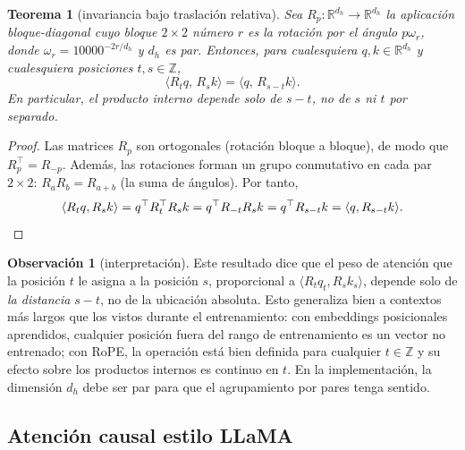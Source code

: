 \documentclass[11pt]{report}
\newenvironment{tcolorbox}[1][]{\par\medskip\noindent\ignorespaces}{\par\medskip}
\theoremstyle{definition}
\newtheorem{observacion}[definicion]{Observación}
\theoremstyle{plain}
\newtheorem{teorema}[definicion]{Teorema}
\numberwithin{equation}{section}
\newcommand{\R}{\mathbb{R}}
\newcommand{\Z}{\mathbb{Z}}
\begin{document}
\begin{tcolorbox}[colback=blue!8, colframe=blue!8, boxrule=0pt]
\begin{teorema}[invariancia bajo traslación relativa]
Sea \(R_p:\R^{d_h}\to\R^{d_h}\) la aplicación bloque-diagonal cuyo bloque \(2\times 2\) número \(r\) es la rotación por el ángulo \(p\omega_r\), donde \(\omega_r=10000^{-2r/d_h}\) y \(d_h\) es par. Entonces, para cualesquiera \(q,k\in\R^{d_h}\) y cualesquiera posiciones \(t,s\in\Z\),
\begin{equation*}
    \langle R_t q,\,R_s k\rangle = \langle q,\,R_{s-t}k\rangle.
\end{equation*}
En particular, el producto interno depende solo de \(s-t\), no de \(s\) ni \(t\) por separado.
\end{teorema}
\end{tcolorbox}

\begin{proof}
Las matrices \(R_p\) son ortogonales (rotación bloque a bloque), de modo que \(R_p^\top=R_{-p}\). Además, las rotaciones forman un grupo conmutativo en cada par \(2\times 2\): \(R_a R_b=R_{a+b}\) (la suma de ángulos). Por tanto,
\begin{equation*}
    \langle R_t q,R_s k\rangle = q^\top R_t^\top R_s k = q^\top R_{-t}R_s k = q^\top R_{s-t}k = \langle q,R_{s-t}k\rangle.\qedhere
\end{equation*}
\end{proof}

\begin{observacion}[interpretación]
Este resultado dice que el peso de atención que la posición \(t\) le asigna a la posición \(s\), proporcional a \(\langle R_t q_t,R_s k_s\rangle\), depende solo de \emph{la distancia} \(s-t\), no de la ubicación absoluta. Esto generaliza bien a contextos más largos que los vistos durante el entrenamiento: con embeddings posicionales aprendidos, cualquier posición fuera del rango de entrenamiento es un vector no entrenado; con RoPE, la operación está bien definida para cualquier \(t\in\Z\) y su efecto sobre los productos internos es continuo en \(t\). En la implementación, la dimensión \(d_h\) debe ser par para que el agrupamiento por pares tenga sentido.
\end{observacion}

\subsection{Atención causal estilo LLaMA}
\end{document}
